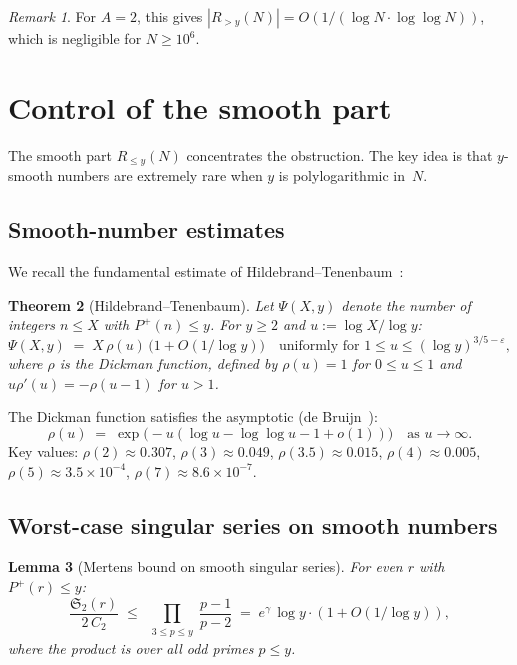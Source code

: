 \documentclass[11pt,reqno]{amsart}
\theoremstyle{plain}
\newtheorem{theorem}{Theorem}[section]
\newtheorem{lemma}[theorem]{Lemma}
\theoremstyle{definition}
\theoremstyle{remark}
\newtheorem{remark}[theorem]{Remark}
\newcommand{\Sfrak}{\mathfrak{S}_2}
\newcommand{\eps}{\varepsilon}
\newcommand{\Pplus}{P^{+}}
\begin{document}
\begin{remark}
For $A = 2$, this gives $|R_{> y}(N)| = O(1/(\log N \cdot \log\log N))$,
which is negligible for $N \ge 10^6$.
\end{remark}

\section{Control of the smooth part}\label{sec:smooth}

The smooth part $R_{\le y}(N)$ concentrates the obstruction.
The key idea is that $y$-smooth numbers are extremely rare when
$y$ is polylogarithmic in~$N$.

\subsection{Smooth-number estimates}

We recall the fundamental estimate of
Hildebrand--Tenenbaum~\cite{HT1986}:

\begin{theorem}[Hildebrand--Tenenbaum]\label{thm:HT}
Let $\Psi(X,y)$ denote the number of integers $n \le X$ with
$\Pplus(n) \le y$. For $y \ge 2$ and $u := \log X / \log y$:
\[
  \Psi(X,y) \;=\; X\, \rho(u)\,
  \bigl(1 + O(1/\log y)\bigr)
  \quad\text{uniformly for } 1 \le u \le (\log y)^{3/5-\eps},
\]
where $\rho$ is the Dickman function, defined by
$\rho(u) = 1$ for $0 \le u \le 1$ and
$u\rho'(u) = -\rho(u-1)$ for $u > 1$.
\end{theorem}

The Dickman function satisfies the asymptotic
(de Bruijn~\cite{deBruijn1966}):
\begin{equation}\label{eq:dickman_asymp}
  \rho(u) \;=\; \exp\bigl(-u(\log u - \log\log u - 1 + o(1))\bigr)
  \quad\text{as } u \to \infty.
\end{equation}
Key values: $\rho(2) \approx 0.307$, $\rho(3) \approx 0.049$,
$\rho(3.5) \approx 0.015$, $\rho(4) \approx 0.005$,
$\rho(5) \approx 3.5 \times 10^{-4}$, $\rho(7) \approx 8.6 \times 10^{-7}$.

\subsection{Worst-case singular series on smooth numbers}

\begin{lemma}[Mertens bound on smooth singular series]\label{lem:mertens}
For even $r$ with $\Pplus(r) \le y$:
\[
  \frac{\Sfrak(r)}{2\,C_2} \;\le\;
  \prod_{\substack{3 \le p \le y}} \frac{p-1}{p-2}
  \;=\; e^{\gamma}\, \log y \cdot (1 + O(1/\log y)),
\]
where the product is over all odd primes $p \le y$.
\end{lemma}
\end{document}
